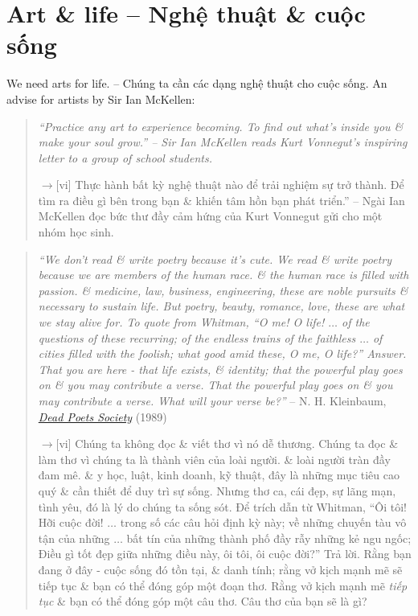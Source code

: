 \documentclass[12pt,oneside]{book}
\begin{document}
\section{Art \& life -- Nghệ thuật \& cuộc sống}
We need arts for life. -- Chúng ta cần các dạng nghệ thuật cho cuộc sống. An advise for artists by Sir {\sc Ian McKellen}:
\begin{quotation}
	{\it``Practice any art to experience becoming. To find out what's inside you \& make your soul grow.'' -- Sir {\sc Ian McKellen} reads {\sc Kurt Vonnegut}'s inspiring letter to a group of school students.}
	
	{\sf[en]$\to$[vi]} Thực hành bất kỳ nghệ thuật nào để trải nghiệm sự trở thành. Để tìm ra điều gì bên trong bạn \& khiến tâm hồn bạn phát triển.'' -- Ngài {\sc Ian McKellen} đọc bức thư đầy cảm hứng của {\sc Kurt Vonnegut} gửi cho một nhóm học sinh.
\end{quotation}

\begin{quotation}
	{\it``We don't read \& write poetry because it's cute. We read \& write poetry because we are members of the human race. \& the human race is filled with passion. \& medicine, law, business, engineering, these are noble pursuits \& necessary to sustain life. But poetry, beauty, romance, love, these are what we stay alive for. To quote from Whitman, ``O me! O life! $\ldots$ of the questions of these recurring; of the endless trains of the faithless $\ldots$ of cities filled with the foolish; what good amid these, O me, O life?'' Answer. That you are here - that life exists, \& identity; that the powerful play goes on \& you may contribute a verse. That the powerful play \emph{goes on} \& you may contribute a verse. What will your verse be?''} --  {\sc N. H. Kleinbaum}, \href{https://www.imdb.com/title/tt0097165}{\it Dead Poets Society} (1989)
	
	{\sf[en]$\to$[vi]} Chúng ta không đọc \& viết thơ vì nó dễ thương. Chúng ta đọc \& làm thơ vì chúng ta là thành viên của loài người. \& loài người tràn đầy đam mê. \& y học, luật, kinh doanh, kỹ thuật, đây là những mục tiêu cao quý \& cần thiết để duy trì sự sống. Nhưng thơ ca, cái đẹp, sự lãng mạn, tình yêu, đó là lý do chúng ta sống sót. Để trích dẫn từ Whitman, ``Ôi tôi! Hỡi cuộc đời! $\ldots$ trong số các câu hỏi định kỳ này; về những chuyến tàu vô tận của những $\ldots$ bất tín của những thành phố đầy rẫy những kẻ ngu ngốc; Điều gì tốt đẹp giữa những điều này, ôi tôi, ôi cuộc đời?'' Trả lời. Rằng bạn đang ở đây - cuộc sống đó tồn tại, \& danh tính; rằng vở kịch mạnh mẽ sẽ tiếp tục \& bạn có thể đóng góp một đoạn thơ. Rằng vở kịch mạnh mẽ \emph{tiếp tục} \& bạn có thể đóng góp một câu thơ. Câu thơ của bạn sẽ là gì?
\end{quotation}
\end{document}
